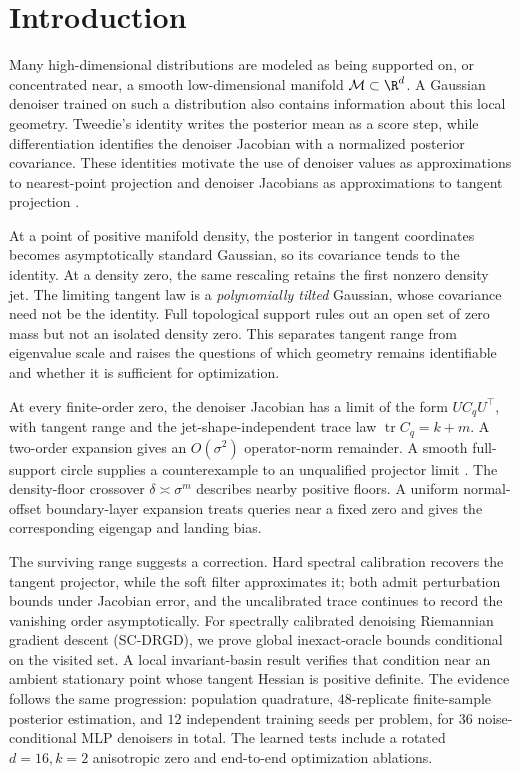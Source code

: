 \documentclass[10pt]{article}
\theoremstyle{c2fup}
\newcommand{\M}{\mathcal{M}}
\newcommand{\tr}{\operatorname{tr}}
\begin{document}
\MakeTitleBox


\section{Introduction}
\label{sec:intro}

Many high-dimensional distributions are modeled as being supported on, or concentrated near, a smooth low-dimensional manifold $\M\subset\R^d$.  A Gaussian denoiser trained on such a distribution also contains information about this local geometry.  Tweedie's identity writes the posterior mean as a score step, while differentiation identifies the denoiser Jacobian with a normalized posterior covariance.  These identities motivate the use of denoiser values as approximations to nearest-point projection and denoiser Jacobians as approximations to tangent projection \citep{alain2014regularized,stanczuk2024diffusion,manor2024posterior,kharitenko2026landing,bamberger2026metric}.

At a point of positive manifold density, the posterior in tangent coordinates becomes asymptotically standard Gaussian, so its covariance tends to the identity.  At a density zero, the same rescaling retains the first nonzero density jet.  The limiting tangent law is a \emph{polynomially tilted} Gaussian, whose covariance need not be the identity.  Full topological support rules out an open set of zero mass but not an isolated density zero.  This separates tangent range from eigenvalue scale and raises the questions of which geometry remains identifiable and whether it is sufficient for optimization.

At every finite-order zero, the denoiser Jacobian has a limit of the form $UC_qU^\top$, with tangent range and the jet-shape-independent trace law $\tr C_q=k+m$.  A two-order expansion gives an $O(\sigma^2)$ operator-norm remainder.  A smooth full-support circle supplies a counterexample to an unqualified projector limit \citep{kharitenko2026landing}.  The density-floor crossover $\delta\asymp\sigma^m$ describes nearby positive floors.  A uniform normal-offset boundary-layer expansion treats queries near a fixed zero and gives the corresponding eigengap and landing bias.

The surviving range suggests a correction.  Hard spectral calibration recovers the tangent projector, while the soft filter approximates it; both admit perturbation bounds under Jacobian error, and the uncalibrated trace continues to record the vanishing order asymptotically.  For spectrally calibrated denoising Riemannian gradient descent (SC-DRGD), we prove global inexact-oracle bounds conditional on the visited set.  A local invariant-basin result verifies that condition near an ambient stationary point whose tangent Hessian is positive definite.  The evidence follows the same progression: population quadrature, $48$-replicate finite-sample posterior estimation, and $12$ independent training seeds per problem, for $36$ noise-conditional MLP denoisers in total.  The learned tests include a rotated $d=16,k=2$ anisotropic zero and end-to-end optimization ablations.
\end{document}
